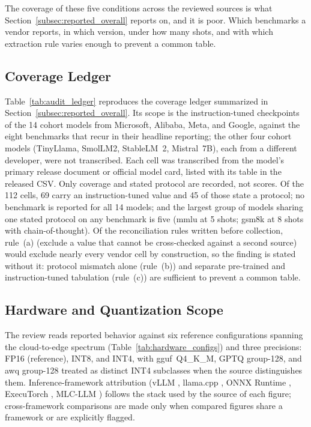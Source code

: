 The coverage of these five conditions across the reviewed sources is what
Section~\ref{subsec:reported_overall} reports on, and it is poor. Which
benchmarks a vendor reports, in which version, under how many shots, and with
which extraction rule varies enough to prevent a common table.

\subsection{Coverage Ledger}
\label{subsec:audit_ledger}

Table~\ref{tab:audit_ledger} reproduces the coverage ledger summarized in
Section~\ref{subsec:reported_overall}. Its scope is the instruction-tuned
checkpoints of the 14 cohort models from Microsoft, Alibaba, Meta, and Google,
against the eight benchmarks that recur in their headline reporting; the other
four cohort models (TinyLlama, SmolLM2, StableLM~2, Mistral~7B), each from a
different developer, were not transcribed.
Each cell was transcribed from the model's primary release document or official
model card, listed with its table in the released CSV. Only coverage and stated
protocol are recorded, not scores. Of the 112 cells, 69 carry an
instruction-tuned value and 45 of those state a protocol; no benchmark is reported
for all 14 models; and the largest group of models sharing one stated protocol on
any benchmark is five (\gls{mmlu} at 5 shots; \gls{gsm8k} at 8 shots with
chain-of-thought). Of the reconciliation rules written before collection, rule~(a)
(exclude a value that cannot be cross-checked against a second source) would
exclude nearly every vendor cell by construction, so the finding is stated without
it: protocol mismatch alone (rule~(b)) and separate pre-trained and
instruction-tuned tabulation (rule~(c)) are sufficient to prevent a common table.



\subsection{Hardware and Quantization Scope}
\label{subsec:reported_hardware}
The review reads reported behavior against six reference configurations spanning the
cloud-to-edge spectrum (Table~\ref{tab:hardware_configs}) and three precisions:
FP16 (reference), INT8, and INT4, with \gls{gguf}~Q4\_K\_M, GPTQ group-128, and \gls{awq}
group-128 treated as distinct INT4 subclasses when the source distinguishes them.
Inference-framework attribution (vLLM \citep{kwon2023vllm}, llama.cpp
\citep{gerganov2023llamacpp}, ONNX Runtime \citep{microsoft2019onnx}, ExecuTorch
\citep{meta2024executorch}, MLC-LLM \citep{mlc2024}) follows the stack used by the
source of each figure; cross-framework comparisons are made only when compared
figures share a framework or are explicitly flagged.

